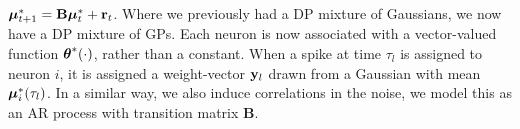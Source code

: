 % 
  $\boldsymbol{\mu}^*_{t+1} = \mathbf{B} \boldsymbol{\mu}^*_t + \mathbf{r}_t$.
Where we previously had a DP mixture of Gaussians, we now have a DP mixture of GPs. Each neuron is now associated with a vector-valued function 
$\boldsymbol{\theta}^*(\cdot)$, rather than a constant. When a spike at time $\tau_l$ is assigned to neuron $i$, it is assigned a weight-vector $\mathbf{y}_l$ drawn from a 
Gaussian with mean $\boldsymbol{\mu}^*_i(\tau_l)$. %
In a similar way, we also induce correlations in the noise, we model this as an AR process with transition matrix $\mathbf{B}$.

% 
